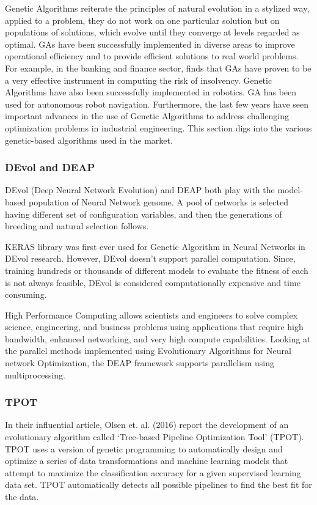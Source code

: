 Genetic Algorithms reiterate the principles of natural evolution in a stylized way, applied to a problem, they do not work on one particular solution but on populations of solutions, which evolve until they converge at levels regarded as optimal\cite{varetto1998genetic}. GAs have been successfully implemented in diverse areas to improve operational efficiency and to provide efficient solutions to real world problems. For example, in the banking and finance sector, \cite{varetto1998genetic} finds that GAs have proven to be a very effective instrument in computing the risk of insolvency. Genetic Algorithms have also been successfully implemented in robotics. GA has been used for autonomous robot navigation\cite{manikas2007genetic}. Furthermore, the last few years have seen important advances in the use of Genetic Algorithms to address challenging optimization problems in industrial engineering\cite{gen1997genetic}. This section digs into the various genetic-based algorithms used in the market.


\subsubsection{DEvol and DEAP}

DEvol (Deep Neural Network Evolution)\cite{DEvol} and DEAP\cite{DEAP_JMLR2012} both play with the model-based population of Neural Network genome. A pool of networks is selected having different set of configuration variables, and then the generations of breeding and natural selection follows. 


KERAS library was first ever used for Genetic Algorithm in Neural Networks in DEvol research. However, DEvol doesn’t support parallel computation. Since, training hundreds or thousands of different models to evaluate the fitness of each is not always feasible, DEvol is considered computationally expensive and time consuming.

High Performance Computing allows scientists and engineers to solve complex science, engineering, and business problems using applications that require high bandwidth, enhanced networking, and very high compute capabilities. Looking at the parallel methods implemented using Evolutionary Algorithms for Neural network Optimization, the DEAP framework supports parallelism using multiprocessing. 


\subsubsection{TPOT}
In their influential article, Olsen et. al. (2016) report the development of an evolutionary algorithm called ‘Tree-based Pipeline Optimization Tool’ (TPOT). TPOT uses a version of genetic programming to automatically design and optimize a series of data transformations and machine learning models that attempt to maximize the classification accuracy for a given supervised learning data set\cite{olson2016automating}. TPOT automatically detects all possible pipelines to find the best fit for the data. 

